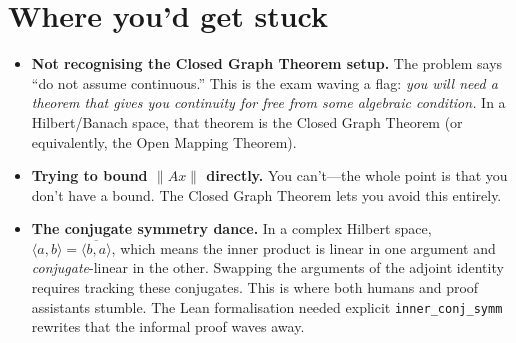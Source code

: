\section{Where you'd get stuck}

\begin{itemize}
\item \textbf{Not recognising the Closed Graph Theorem setup.} The
  problem says ``do not assume continuous.'' This is the exam waving a
  flag: \emph{you will need a theorem that gives you continuity for free
  from some algebraic condition.} In a Hilbert/Banach space, that
  theorem is the Closed Graph Theorem (or equivalently, the Open Mapping
  Theorem).
\item \textbf{Trying to bound $\|Ax\|$ directly.} You can't---the
  whole point is that you don't have a bound. The Closed Graph Theorem
  lets you avoid this entirely.
\item \textbf{The conjugate symmetry dance.} In a complex Hilbert space,
  $\langle a, b \rangle = \overline{\langle b, a \rangle}$, which means
  the inner product is linear in one argument and \emph{conjugate}-linear
  in the other. Swapping the arguments of the adjoint identity requires
  tracking these conjugates. This is where both humans and proof
  assistants stumble. The Lean formalisation needed explicit
  \texttt{inner\_conj\_symm} rewrites that the informal proof waves
  away.
\end{itemize}
